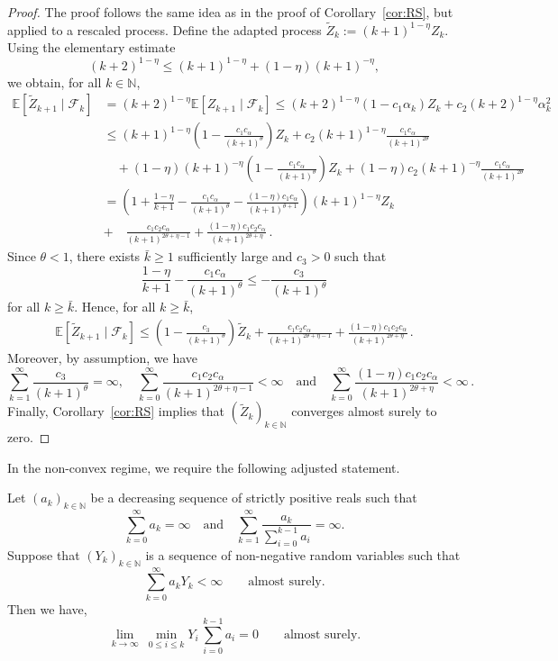 \documentclass[12pt,openany]{book}
\theoremstyle{definition}
\theoremstyle{definition}
\newcommand{\N}{\mathbb{N}}
\begin{document}
\begin{proof}
The proof follows the same idea as in the proof of Corollary~\ref{cor:RS}, but applied to a rescaled process. Define the adapted process $\widetilde Z_k:=(k+1)^{1-\eta}Z_k$.
Using the elementary estimate
\[
(k+2)^{1-\eta}
\leq
(k+1)^{1-\eta}+(1-\eta)(k+1)^{-\eta},
\]
we obtain, for all $k\in\N$,
\[
\begin{aligned}
\mathbb{E}[\widetilde Z_{k+1}\mid \mathcal{F}_k]
&=
(k+2)^{1-\eta}
\mathbb{E}[Z_{k+1}\mid \mathcal{F}_k]\leq
(k+2)^{1-\eta}
(1-c_1\alpha_k)Z_k
+
c_2(k+2)^{1-\eta}\alpha_k^2 \\
&\le (k+1)^{1-\eta} (1-\frac{c_1 c_\alpha}{(k+1)^{\theta}})Z_k + c_2(k+1)^{1-\eta}\frac{c_1 c_\alpha}{(k+1)^{2\theta}}\\ &\quad + (1-\eta)(k+1)^{-\eta} (1-\frac{c_1 c_\alpha}{(k+1)^{\theta}})Z_k + (1-\eta)c_2(k+1)^{-\eta} \frac{c_1 c_\alpha}{(k+1)^{2\theta}} \\
&=(1+\frac{1-\eta}{k+1}-\frac{c_1 c_\alpha}{(k+1)^{\theta}}-\frac{(1-\eta)c_1c_\alpha}{(k+1)^{\theta+1}})(k+1)^{1-\eta}Z_k\\
&+\quad \frac{c_1c_2c_\alpha}{(k+1)^{2\theta+\eta-1}} + \frac{(1-\eta)c_1c_2c_\alpha}{(k+1)^{2\theta+\eta}}\,.
\end{aligned}
\]
Since $\theta< 1$, there exists $\bar k\ge1$ sufficiently large and $c_3>0$ such that
\[ \frac{1-\eta}{k+1}-\frac{c_1c_\alpha}{(k+1)^\theta}\le - \frac{c_3}{(k+1)^\theta}\]
for all $k\ge\bar k$. Hence, for all $k\ge\bar k$,
\[
\begin{aligned}
\mathbb{E}[\widetilde Z_{k+1}\mid \mathcal{F}_k]\le (1-\frac{c_3}{(k+1)^\theta})\tilde Z_k + \frac{c_1c_2c_\alpha}{(k+1)^{2\theta+\eta-1}} + \frac{(1-\eta)c_1c_2c_\alpha}{(k+1)^{2\theta+\eta}}\,.
\end{aligned}
\]
Moreover, by assumption, we have
\[ \sum_{k=1}^\infty\frac{c_3}{(k+1)^\theta}=\infty,\quad \sum_{k=0}^\infty \frac{c_1c_2c_\alpha}{(k+1)^{2\theta+\eta-1}}<\infty\quad \text{and}\quad \sum_{k=0}^\infty \frac{(1-\eta)c_1c_2c_\alpha}{(k+1)^{2\theta+\eta}}<\infty\,.\]
Finally, Corollary~\ref{cor:RS} implies that $(\widetilde Z_k)_{k\in\mathbb{N}}$ converges almost surely to zero.
\end{proof}

In the non-convex regime, we require the following adjusted statement.
\begin{lemma}\label{lem:sum_rates}
Let $(a_k)_{k\in\mathbb{N}}$ be a decreasing sequence of strictly positive reals such that
\[
\sum_{k=0}^{\infty}a_k=\infty
\quad 
\text{and}
\quad
\sum_{k=1}^{\infty}\frac{a_k}{\sum_{i=0}^{k-1}a_i}=\infty.
\]
Suppose that $(Y_k)_{k\in\mathbb{N}}$ is a sequence of non-negative random variables such that
\[
\sum_{k=0}^{\infty}a_kY_k<\infty
\qquad \text{almost surely}.
\]
Then we have,
\[
\lim_{k\to\infty}\ \min_{0\leq i\leq k}Y_i\, \sum_{i=0}^{k-1} a_i
=
0
\qquad \text{almost surely}.
\]
\end{lemma}
\end{document}

